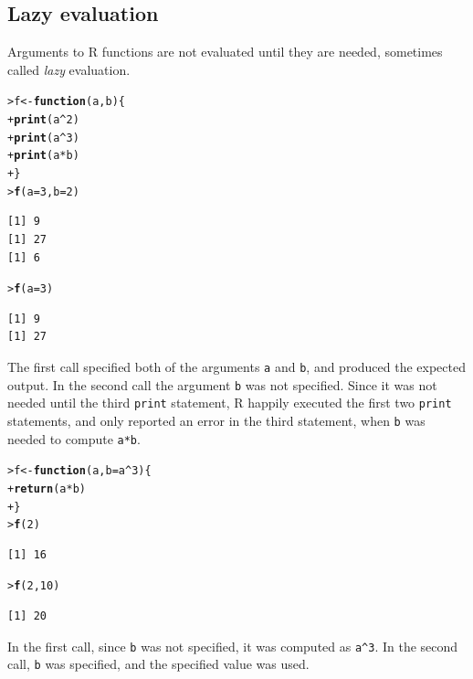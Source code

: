 \documentclass[12pt,oneside]{book}\usepackage[]{graphicx}\usepackage[]{color}
\makeatletter
\newcommand{\hlnum}[1]{\textcolor[rgb]{0.686,0.059,0.569}{#1}}%
\newcommand{\hlopt}[1]{\textcolor[rgb]{0,0,0}{#1}}%
\newcommand{\hlstd}[1]{\textcolor[rgb]{0.345,0.345,0.345}{#1}}%
\newcommand{\hlkwa}[1]{\textcolor[rgb]{0.161,0.373,0.58}{\textbf{#1}}}%
\newcommand{\hlkwb}[1]{\textcolor[rgb]{0.69,0.353,0.396}{#1}}%
\newcommand{\hlkwc}[1]{\textcolor[rgb]{0.333,0.667,0.333}{#1}}%
\newcommand{\hlkwd}[1]{\textcolor[rgb]{0.737,0.353,0.396}{\textbf{#1}}}%
\newenvironment{kframe}{%
 \def\at@end@of@kframe{}%
 \ifinner\ifhmode%
  \def\at@end@of@kframe{\end{minipage}}%
  \begin{minipage}{\columnwidth}%
 \fi\fi%
 \def\FrameCommand##1{\hskip\@totalleftmargin \hskip-\fboxsep
 \colorbox{shadecolor}{##1}\hskip-\fboxsep
     \hskip-\linewidth \hskip-\@totalleftmargin \hskip\columnwidth}%
 \MakeFramed {\advance\hsize-\width
   \@totalleftmargin\z@ \linewidth\hsize
   \@setminipage}}%
 {\par\unskip\endMakeFramed%
 \at@end@of@kframe}
\newenvironment{knitrout}{}{} %
\makeatother
\begin{document}
\subsection{Lazy evaluation}
Arguments to R functions are not evaluated until they are needed, sometimes called \emph{lazy} evaluation. 
\begin{knitrout}
\color{fgcolor}\begin{kframe}
\begin{alltt}
\hlstd{> }\hlstd{f} \hlkwb{<-} \hlkwa{function}\hlstd{(}\hlkwc{a}\hlstd{,} \hlkwc{b}\hlstd{) \{}
\hlstd{+ }    \hlkwd{print}\hlstd{(a}\hlopt{^}\hlnum{2}\hlstd{)}
\hlstd{+ }    \hlkwd{print}\hlstd{(a}\hlopt{^}\hlnum{3}\hlstd{)}
\hlstd{+ }    \hlkwd{print}\hlstd{(a} \hlopt{*} \hlstd{b)}
\hlstd{+ }\hlstd{\}}
\hlstd{> }\hlkwd{f}\hlstd{(}\hlkwc{a} \hlstd{=} \hlnum{3}\hlstd{,} \hlkwc{b} \hlstd{=} \hlnum{2}\hlstd{)}
\end{alltt}
\begin{verbatim}
[1] 9
[1] 27
[1] 6
\end{verbatim}
\begin{alltt}
\hlstd{> }\hlkwd{f}\hlstd{(}\hlkwc{a} \hlstd{=} \hlnum{3}\hlstd{)}
\end{alltt}
\begin{verbatim}
[1] 9
[1] 27
\end{verbatim}


{\ttfamily\noindent\bfseries{}}\end{kframe}
\end{knitrout}
The first call specified both of the arguments \verb+a+ and \verb+b+, and produced the expected output. In the second call the argument \verb+b+ was not specified. Since it was not needed until the third \verb+print+ statement, R happily executed the first two \verb+print+ statements, and only reported an error in the third statement, when \verb+b+ was needed to compute \verb+a*b+. 
\begin{knitrout}
\color{fgcolor}\begin{kframe}
\begin{alltt}
\hlstd{> }\hlstd{f} \hlkwb{<-} \hlkwa{function}\hlstd{(}\hlkwc{a}\hlstd{,} \hlkwc{b} \hlstd{= a}\hlopt{^}\hlnum{3}\hlstd{) \{}
\hlstd{+ }    \hlkwd{return}\hlstd{(a} \hlopt{*} \hlstd{b)}
\hlstd{+ }\hlstd{\}}
\hlstd{> }\hlkwd{f}\hlstd{(}\hlnum{2}\hlstd{)}
\end{alltt}
\begin{verbatim}
[1] 16
\end{verbatim}
\begin{alltt}
\hlstd{> }\hlkwd{f}\hlstd{(}\hlnum{2}\hlstd{,} \hlnum{10}\hlstd{)}
\end{alltt}
\begin{verbatim}
[1] 20
\end{verbatim}
\end{kframe}
\end{knitrout}
In the first call, since \verb+b+ was not specified, it was computed as \verb+a^3+. In the second call, \verb+b+ was specified, and the specified value was used. 
\end{document}
